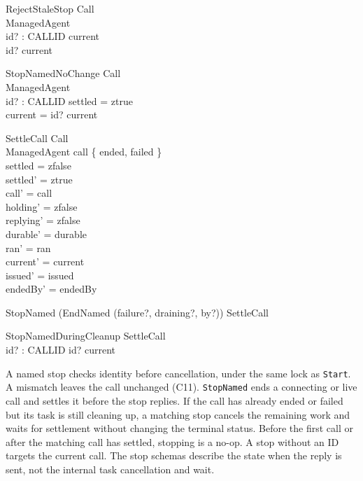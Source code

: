 \documentclass[a4paper,10pt,fleqn]{article}
\begin{document}
\begin{schema}{RejectStaleStop}
  \Xi Call \\
  \Xi ManagedAgent \\
  id? : CALLID
\where
  current \neq \emptyset \\
  id? \notin current
\end{schema}

\begin{schema}{StopNamedNoChange}
  \Xi Call \\
  \Xi ManagedAgent \\
  id? : CALLID
\where
  settled = ztrue \\
  current = \emptyset \lor id? \in current
\end{schema}

\begin{schema}{SettleCall}
  \Delta Call \\
  \Xi ManagedAgent
\where
  call \in \{ ended, failed \} \\
  settled = zfalse \\
  settled' = ztrue \\
  call' = call \\
  holding' = zfalse \\
  replying' = zfalse \\
  durable' = durable \\
  ran' = ran \\
  current' = current \\
  issued' = issued \\
  endedBy' = endedBy
\end{schema}

\begin{zed}
  StopNamed  (EndNamed \hide (failure?, draining?, by?)) \semi SettleCall
\end{zed}

\begin{schema}{StopNamedDuringCleanup}
  SettleCall \\
  id? : CALLID
\where
  id? \in current
\end{schema}

A named stop checks identity before cancellation, under the same lock as
\texttt{Start}. A mismatch leaves the call unchanged (C11).
\texttt{StopNamed} ends a connecting or live call and settles it before
the stop replies. If the call has already ended or failed but its task is
still cleaning up, a matching stop cancels the remaining work and waits
for settlement without changing the terminal status. Before the first
call or after the matching call has settled, stopping is a no-op. A stop
without an ID targets the current call.
The stop schemas describe the state when the reply is sent, not the
internal task cancellation and wait.
\end{document}
